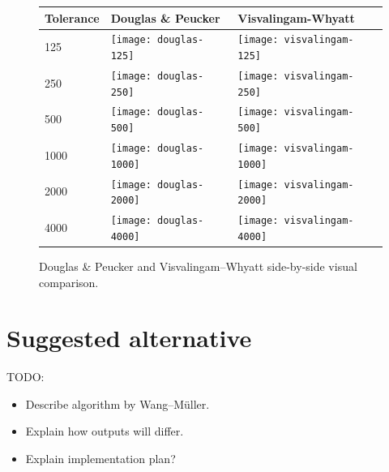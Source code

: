 \documentclass[a4paper]{article}
\newcommand{\DP}{Douglas \& Peucker}
\newcommand{\VW}{Visvalingam--Whyatt}
\newcommand{\WM}{Wang--M{\"u}ller}
\begin{document}
\begin{figure}[H]
    \renewcommand{\tabularxcolumn}[1]{>{\center\small}m{#1}}
    \begin{tabularx}{\textwidth}{ p{1.5cm} | X | X | }
        Tolerance                                                 &
        Douglas \& Peucker                                        &
        Visvalingam-Whyatt                                        \tabularnewline \hline

        125                                                       &
        \texttt{[image: douglas-125]}           &
        \texttt{[image: visvalingam-125]}       \tabularnewline \hline

        250                                                       &
        \texttt{[image: douglas-250]}         &
        \texttt{[image: visvalingam-250]}     \tabularnewline \hline

        500                                                       &
        \texttt{[image: douglas-500]}        &
        \texttt{[image: visvalingam-500]}    \tabularnewline \hline

        1000                                                      &
        \texttt{[image: douglas-1000]}      &
        \texttt{[image: visvalingam-1000]}  \tabularnewline \hline

        2000                                                      &
        \texttt{[image: douglas-2000]}     &
        \texttt{[image: visvalingam-2000]} \tabularnewline \hline

        4000                                                      &
        \texttt{[image: douglas-4000]}     &
        \texttt{[image: visvalingam-4000]} \tabularnewline \hline
    \end{tabularx}
    \caption{{\DP} and {\VW} side-by-side visual comparison.}
    \label{tab:dp-vs-vw}
\end{figure}

\section{Suggested alternative}
\label{sec:suggested_alternative}

TODO:
\begin{itemize}
    \item Describe algorithm by {\WM}.
    \item Explain how outputs will differ.
    \item Explain implementation plan?
\end{itemize}
\end{document}
